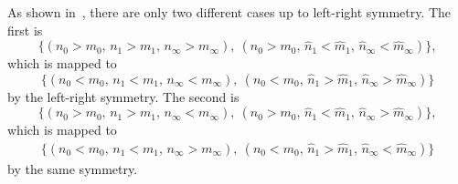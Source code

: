 As shown in~, there are only two different cases up to left-right symmetry.
The first is
\begin{equation}
  \Big\lbrace
    (n_{0} > m_{0},\, n_{1} > m_{1},\, n_{\infty} >  m_{\infty} ),~
    (n_{0} > m_{0},\, \hat{n}_{1} < \hat{m}_{1},\, \hat{n}_{\infty} < \hat{m}_{\infty})
  \Big\rbrace,
\end{equation}
which is mapped to
\begin{equation}
  \Big\lbrace
    (n_{0} < m_{0},\, n_{1} < m_{1},\, n_{\infty} <  m_{\infty} ),~
    (n_{0} < m_{0},\, \hat{n}_{1} > \hat{m}_{1},\, \hat{n}_{\infty} > \hat{m}_{\infty})
  \Big\rbrace
\end{equation}
by the left-right symmetry.
The second is
\begin{equation}
  \Big\lbrace
    (n_{0} > m_{0},\, n_{1} > m_{1},\, n_{\infty} <  m_{\infty} ),~
    (n_{0} > m_{0},\, \hat{n}_{1} < \hat{m}_{1},\, \hat{n}_{\infty} > \hat{m}_{\infty})
  \Big\rbrace,
\end{equation}
which is mapped to
\begin{align}
  \Big\lbrace
    (n_{0} < m_{0},\, n_{1} < m_{1},\, n_{\infty} >  m_{\infty} ),~
    (n_{0} < m_{0},\, \hat{n}_{1} > \hat{m}_{1},\, \hat{n}_{\infty} < \hat{m}_{\infty})
  \Big\rbrace
\end{align}
by the same symmetry.

